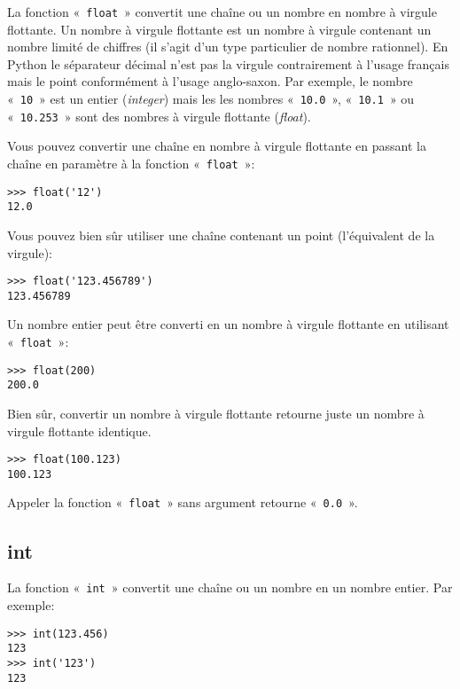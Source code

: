 La fonction «~\texttt{float}~» convertit une chaîne ou un nombre en nombre à virgule flottante. Un nombre à virgule flottante est un nombre à virgule contenant un nombre limité de chiffres (il s'agit d'un type particulier de nombre rationnel). En Python le séparateur décimal n'est pas la virgule contrairement à l'usage français mais le point conformément à l'usage anglo-saxon. Par exemple, le nombre «~\texttt{10}~» est un entier (\emph{integer}) mais les les nombres «~\texttt{10.0}~», «~\texttt{10.1}~» ou «~\texttt{10.253}~» sont des nombres à virgule flottante (\emph{float}).

Vous pouvez convertir une chaîne en nombre à virgule flottante en passant la chaîne en paramètre à la fonction «~\texttt{float}~»: 
\begin{Verbatim}[frame=single,rulecolor=\color{gray}]
>>> float('12')
12.0
\end{Verbatim}

Vous pouvez bien sûr utiliser une chaîne contenant un point (l'équivalent de la virgule):

\begin{Verbatim}[frame=single,rulecolor=\color{gray}]
>>> float('123.456789')
123.456789
\end{Verbatim}

Un nombre entier peut être converti en un nombre à virgule flottante en utilisant «~\texttt{float}~»: 
\begin{Verbatim}[frame=single,rulecolor=\color{gray}]
>>> float(200)
200.0
\end{Verbatim}

Bien sûr, convertir un nombre à virgule flottante retourne juste un nombre à virgule flottante identique.
\begin{Verbatim}[frame=single,rulecolor=\color{gray}]
>>> float(100.123)
100.123
\end{Verbatim}

Appeler la fonction «~\texttt{float}~» sans argument retourne «~\texttt{0.0}~». 

\subsection*{int}

La fonction «~\texttt{int}~» convertit une chaîne ou un nombre en un nombre entier. Par exemple:

\begin{Verbatim}[frame=single,rulecolor=\color{gray}]
>>> int(123.456)
123
>>> int('123')
123
\end{Verbatim}

